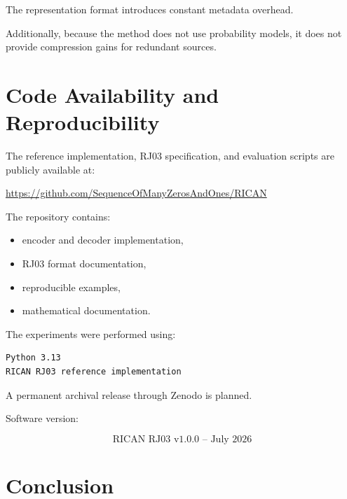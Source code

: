 \documentclass[onecolumn]{IEEEtran}
\begin{document}
The representation format introduces constant metadata overhead.

Additionally, because the method does not use probability models, it
does not provide compression gains for redundant sources.


\section{Code Availability and Reproducibility}

The reference implementation, RJ03 specification, and evaluation
scripts are publicly available at:

\begin{center}
\url{https://github.com/SequenceOfManyZerosAndOnes/RICAN}
\end{center}

The repository contains:

\begin{itemize}

\item encoder and decoder implementation,

\item RJ03 format documentation,

\item reproducible examples,

\item mathematical documentation.

\end{itemize}

The experiments were performed using:

\begin{verbatim}
Python 3.13
RICAN RJ03 reference implementation
\end{verbatim}

A permanent archival release through Zenodo is planned.

Software version:

\[
\text{RICAN RJ03 v1.0.0 -- July 2026}
\]


\section{Conclusion}
\end{document}
